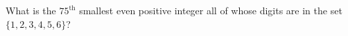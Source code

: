 What is the $75^{\text{th}}$ smallest even positive integer all of whose digits are in the set $\{1,2,3,4,5,6\}$?
